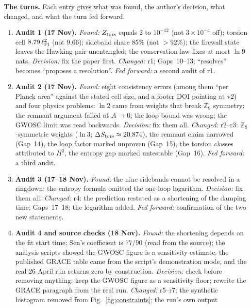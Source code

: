 \documentclass[11pt,a4paper]{article}
\begin{document}
\smallskip
\noindent\textbf{The turns.} Each entry gives what was found, the author's decision, what
changed, and what the turn fed forward.
\begin{enumerate}[leftmargin=*, label=\textbf{T\arabic*.}, itemsep=3pt]
  \item \textbf{Audit 1 (17 Nov).} \emph{Found:} $Z_{\rm tors}$ equals 2 to $10^{-12}$
    (not $3\times10^{-4}$ off); torsion cell $8.79\,\ell_{\rm Pl}^2$ (not 9.66); sideband share
    85\% (not ${>}92\%$); the firewall state leaves the Hawking pair unentangled; the
    conservation law fixes at most $\ln 9$ nats. \emph{Decision:} fix the paper first.
    \emph{Changed:} r1; Gaps~10--13; ``resolves'' becomes ``proposes a resolution''.
    \emph{Fed forward:} a second audit of r1.
  \item \textbf{Audit 2 (17 Nov).} \emph{Found:} eight consistency errors (among them
    ``per Planck area'' against the stated cell size, and a footer DOI pointing at v2) and
    four physics problems: $\ln 2$ came from weights that break $\mathbb{Z}_9$ symmetry;
    the remnant argument failed at $A\to 0$; the loop bound was wrong; the GWOSC limit was
    read backwards. \emph{Decision:} fix them all. \emph{Changed:} r2--r3:
    $\mathbb{Z}_9$-symmetric weights ($\ln 3$; $\Delta S_{\rm tors} \approx 20.874$), the
    remnant claim narrowed (Gap~14), the loop factor marked unproven (Gap~15), the torsion
    classes attributed to $H^3$, the entropy gap marked untestable (Gap~16).
    \emph{Fed forward:} a third audit.
  \item \textbf{Audit 3 (17--18 Nov).} \emph{Found:} the nine sidebands cannot be resolved
    in a ringdown; the entropy formula omitted the one-loop logarithm. \emph{Decision:} fix
    them all. \emph{Changed:} r4: the prediction restated as a shortening of the damping
    time; Gaps~17--18; the logarithm added. \emph{Fed forward:} confirmation of the two new
    statements.
  \item \textbf{Audit 4 and source checks (18 Nov).} \emph{Found:} the shortening depends on
    the fit start time; Sen's coefficient is $77/90$ (read from the source); the analysis
    scripts showed the GWOSC figure is a sensitivity estimate, the published GRACE table came
    from the script's demonstration mode, and the real 26 April run returns zero by
    construction. \emph{Decision:} check before removing anything; keep the GWOSC figure as a
    sensitivity floor; rewrite the GRACE paragraph from the real run. \emph{Changed:} r5--r7;
    the synthetic histogram removed from Fig.~\ref{fig:constraints}; the run's own output

\end{enumerate}
\end{document}
